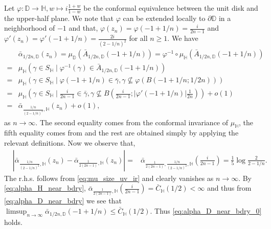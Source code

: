 \documentclass[a4paper, 11pt, reqno]{amsart}
\theoremstyle{definition} \newtheorem{defn}{Definition}[section]
\theoremstyle{remark} \newtheorem{rem}[defn]{Remark}
\theoremstyle{remark} \newtheorem*{rem*}{Remark}
\theoremstyle{plain} \newtheorem{thm}[defn]{Theorem}
\theoremstyle{plain} \newtheorem{lem}[defn]{Lemma}
\theoremstyle{plain} \newtheorem{prop}[defn]{Proposition}
\theoremstyle{plain} \newtheorem{cor}[defn]{Corollary}
\theoremstyle{remark} \newtheorem{exm}[defn]{\textbf{Example}}
\theoremstyle{remark} \newtheorem{exms}[defn]{\textbf{Examples}}
\theoremstyle{remark} \newtheorem*{bl}{}
\numberwithin{equation}{section} %
\newcommand{\D}{\mathbb{D}}
\newcommand{\bH}{\mathbb{H}}
\begin{document}
        Let $\varphi: \D \to \bH, w \mapsto i\frac{1+w}{1-w}$ be the conformal equivalence between the unit disk and the upper-half plane. We note that $\varphi$ can be extended locally to $\partial \D$ in a neighborhood of $-1$ and that, $\varphi(z_n) = \varphi(-1+1/n) = \frac{i}{2n-1}$ and $\varphi'(z_n) =\varphi'(-1+1/n) = \frac{2i}{(2-1/n)^2}$ for all $n \ge 1$. We have        \begin{align}\label{eq:alpha_D_near_bdry}
            & \bar{\alpha}_{1/2n, \D} (z_n) =   \mu_{\D} (\bar{A}_{1/2n, \D} (-1+1/n) )
            = \varphi^{-1}\circ \mu_{\bH} (\bar{A}_{1/2n, \D} (-1+1/n) ) 
            \nonumber \\
            = &  \mu_{\bH} (\gamma \in S_{\bH} \mid \varphi^{-1}(\gamma) \in \bar{A}_{1/2n, \D} (-1+1/n)  )
            \nonumber \\
            = & \mu_{\bH} (\gamma \in S_{\bH} \mid \varphi(-1+1/n) \in \bar{\gamma}, \gamma \nsubseteq \varphi (B(-1+1/n ; 1/2n) ) )
            \nonumber \\
            = & \mu_{\bH} \left(\gamma \in S_{\bH} \mid \frac{i}{2n-1} \in \bar{\gamma}, \gamma \nsubseteq B(\frac{i}{2n-1}  ; |\varphi'(-1+1/n)| \frac{1}{2n}) \right) + o(1)
            \nonumber \\
            = & \bar{\alpha}_{\frac{1/n}{(2-1/n)^2}, \bH} \left( z_n \right) + o(1),
        \end{align}
        as $n \to \infty$. The second equality comes from the conformal invariance of $\mu_{\bH}$, the fifth equality comes from \cite[Lemma 4.2]{cgk16} and the rest are obtained simply by applying the relevant definitions. 
        Now we observe that, 
        \begin{align}
            & \left|\bar{\alpha}_{\frac{1/n}{(2-1/n)^2}, \bH} \left( z_n \right) -  \bar{\alpha}_{\frac{1}{2(2n-1)}, \bH} \left( z_n \right) \right| 
            = & \bar{\alpha}_{\frac{1}{2(2n-1)}, \frac{1/n}{(2-1/n)^2}, \bH} \left( \frac{i}{2n-1} \right)  = \frac{1}{5} \log \frac{2}{2-1/n}.
        \end{align}
        The r.h.s. follows from \eqref{eq:mu_size_uv_ir} and clearly vanishes as $n \to \infty$.
        By \eqref{eq:alpha_H_near_bdry}, $ \bar{\alpha}_{\frac{1}{2(2n-1)}, \bH} \left( \frac{i}{2n-1} \right) = \bar{C}_{\bH} (1/2)< \infty$ and thus from \eqref{eq:alpha_D_near_bdry} we see that $\limsup_{n \to \infty} \bar{\alpha}_{1/2n, \D}(-1+1/n) \le \bar{C}_{\bH}(1/2)$. Thus \eqref{eq:alpha_D_near_bdry_0} holds.
                  
\end{document}
